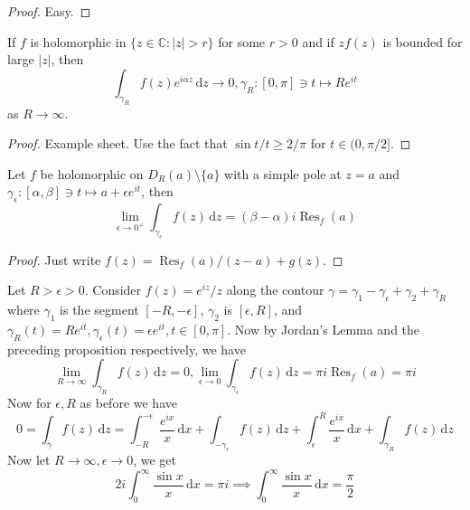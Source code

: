 \begin{proof}
    Easy.
\end{proof}
\begin{proposition}
    If $f$ is holomorphic in $\{z\in\mathbb C:|z|>r\}$ for some $r>0$ and if $zf(z)$ is bounded for large $|z|$, then
    $$\int_{\gamma_R}f(z)e^{i\alpha z}\,\mathrm dz\to 0,\gamma_R:[0,\pi]\ni t\mapsto Re^{it}$$
    as $R\to\infty$.
\end{proposition}
\begin{proof}
    Example sheet.
    Use the fact that $\sin t/t\ge 2/\pi$ for $t\in (0,\pi/2]$.
\end{proof}
\begin{proposition}
    Let $f$ be holomorphic on $D_R(a)\setminus\{a\}$ with a simple pole at $z=a$ and $\gamma_\epsilon:[\alpha,\beta]\ni t\mapsto a+\epsilon e^{it}$, then
    $$\lim_{\epsilon\to 0^+}\int_{\gamma_\epsilon}f(z)\,\mathrm dz=(\beta-\alpha)i\operatorname{Res}_f(a)$$
\end{proposition}
\begin{proof}
    Just write $f(z)=\operatorname{Res}_f(a)/(z-a)+g(z)$.
\end{proof}
\begin{example}
    Let $R>\epsilon>0$.
    Consider $f(z)=e^{iz}/z$ along the contour $\gamma=\gamma_1-\gamma_\epsilon+\gamma_2+\gamma_R$ where $\gamma_1$ is the segment $[-R,-\epsilon]$, $\gamma_2$ is $[\epsilon,R]$, and $\gamma_R(t)=Re^{it},\gamma_\epsilon(t)=\epsilon e^{it},t\in [0,\pi]$.
    Now by Jordan's Lemma and the preceding proposition respectively, we have
    $$\lim_{R\to\infty}\int_{\gamma_R}f(z)\,\mathrm dz=0,\lim_{\epsilon\to 0}\int_{\gamma_\epsilon}f(z)\,\mathrm dz=\pi i\operatorname{Res}_f(a)=\pi i$$
    Now for $\epsilon,R$ as before we have
    $$0=\int_\gamma f(z)\,\mathrm dz=\int_{-R}^{-\epsilon}\frac{e^{ix}}{x}\,\mathrm dx+\int_{-\gamma_\epsilon}f(z)\,\mathrm dz+\int_\epsilon^R\frac{e^{ix}}{x}\,\mathrm dx+\int_{\gamma_R}f(z)\,\mathrm dz$$
    Now let $R\to\infty,\epsilon\to 0$, we get
    $$2i\int_0^\infty\frac{\sin x}{x}\,\mathrm dx=\pi i\implies\int_0^\infty\frac{\sin x}{x}\,\mathrm dx=\frac{\pi}{2}$$
\end{example}